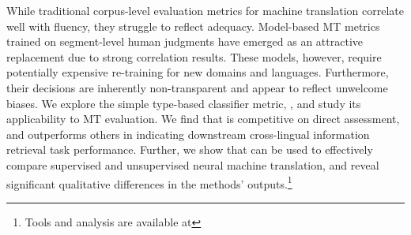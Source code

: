 



While traditional corpus-level evaluation metrics for machine translation correlate well with fluency, they struggle to reflect adequacy.
Model-based MT metrics trained on segment-level human judgments have emerged as an attractive replacement due to strong correlation results.
These models, however, require potentially expensive re-training for new domains and languages.
Furthermore, their decisions are inherently non-transparent and appear to reflect unwelcome biases. 
We explore the simple type-based classifier metric, , and study its applicability to MT evaluation. 
We find that  is competitive on direct assessment, and outperforms others in indicating downstream cross-lingual information retrieval task performance.
Further, we show that  can be used to effectively compare supervised and unsupervised neural machine translation, and reveal significant qualitative differences in the methods' outputs.\footnote{Tools and analysis are available at 
}

